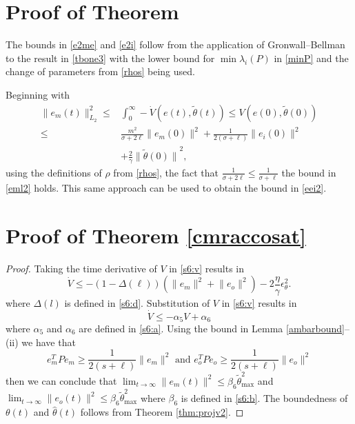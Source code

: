 \documentclass[10pt,journal]{IEEEtran}
\theoremstyle{plain}%
\theoremstyle{definition}
\newcommand{\be}[0]{\begin{equation}}
\newcommand{\ee}[0]{\end{equation}}
\newcommand{\ben}[0]{\begin{equation*}}
\newcommand{\een}[0]{\end{equation*}}
\newcommand{\norms}[1]{\lVert#1\rVert}
\newcommand{\normB}[0]{\norms}
\let\norm=\normB
\begin{document}
\section{Proof of Theorem \label{eperf}}\label{proofeperf}
The bounds in \eqref{e2me} and \eqref{e2i} follow from the application of Gronwall--Bellman to the result in \eqref{tbone3} with the lower bound for $\min \lambda_i(P)$ in \eqref{minP} and the change of parameters from \eqref{rhos} being used.

Beginning with \be\begin{split}\label{elfirst}
\norm{e_m(t)}_{L_2}^2 \leq & \int_0^\infty - \dot V(e(t),\tilde\theta(t)) \leq V(e(0),\tilde\theta(0)) \\
\leq& \frac{m^2}{\sigma+ 2\ell} \norm{e_m(0)}^2 +\frac{1}{2(\sigma+\ell)} \norm{e_i(0)}^2\\&+ \frac{2}{\gamma}{\norm{\tilde\theta(0)}}^2,
\end{split}\ee using the definitions of $\rho$ from \eqref{rhos}, the fact that
$\frac{1}{\sigma+ 2\ell} \leq \frac{1}{\sigma + \ell}$ the bound in \eqref{eml2} holds. This same approach can be used to obtain the bound in \eqref{eei2}.



\section{Proof of Theorem \ref{cmraccosat}}\label{pcmraccosat}
\begin{proof}
Taking the time derivative of $V$ in \eqref{s6:v} results in
\be
\dot V \leq -\left(1-\Delta(\ell ) \right)\left(\norm{e_m}^2 +\norm{e_o}^2\right) -2\frac\eta\gamma\epsilon_\theta^2.
\ee
where $\Delta(l)$ is defined in \eqref{s6:d}. Substitution of $V$ in \eqref{s6:v} results in
\be
\dot V \leq -\alpha_5 V + \alpha_{6}
\ee
where $\alpha_5$ and $\alpha_{6}$ are defined in \eqref{s6:a}. Using the bound in Lemma \ref{ambarbound}--(ii) we have that 
\ben e_m^TPe_m \geq \frac 1 {2(s+\ell) }\norm {e_m}^2 \text{ and } e_o^TPe_o \geq \frac 1 {2(s+\ell) }\norm {e_o}^2 \een 
then we can conclude that
${\lim_{t\rightarrow\infty}\norm {e_m(t)}^2 \leq \beta_6 \tilde\theta_\text{max}^2}$ and ${\lim_{t\rightarrow\infty}\norm {e_o(t)}^2 \leq \beta_6 \tilde\theta_\text{max}^2}$
where $\beta_6$ is defined in \eqref{s6:b}. The boundedness of $\theta(t)$ and $\hat\theta(t)$ follows from Theorem \ref{thm:projv2}.
\end{proof}
\end{document}

